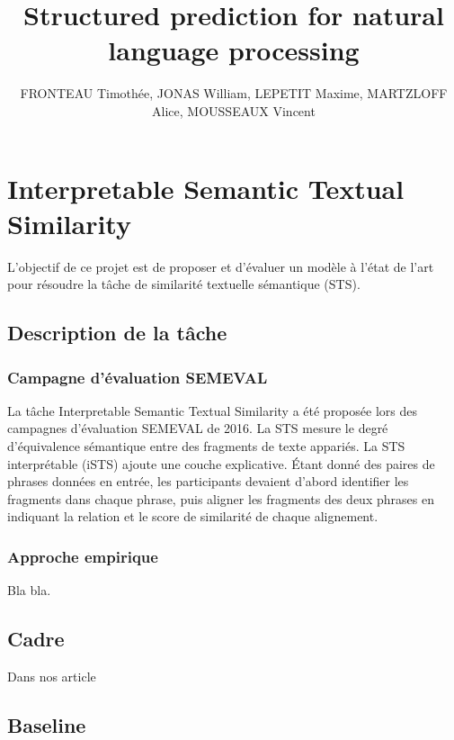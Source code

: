 \documentclass[a4paper, twoside, 12pt]{article}
\title{\huge Structured prediction for natural language processing}
\author{FRONTEAU Timothée, JONAS William, LEPETIT Maxime, MARTZLOFF Alice, MOUSSEAUX Vincent}
\affil{Aix-Marseille Université}
\begin{document}
 \maketitle
 \section{Interpretable Semantic Textual Similarity}
    L'objectif de ce projet est de proposer et d'évaluer un modèle à l’état de l’art pour résoudre la tâche de similarité textuelle sémantique (STS).

    \subsection{Description de la tâche}

        \subsubsection{Campagne d’évaluation SEMEVAL}

    La tâche Interpretable Semantic Textual Similarity a été proposée lors des campagnes d’évaluation SEMEVAL de 2016. La STS mesure le degré d'équivalence sémantique entre des fragments de texte appariés. La STS interprétable (iSTS) ajoute une couche explicative. Étant donné des paires de phrases données en entrée, les participants devaient d'abord identifier les fragments dans chaque phrase, puis aligner les fragments des deux phrases en indiquant la relation et le score de similarité de chaque alignement.

        \subsubsection{Approche empirique}

    Bla bla.
    \subsection{Cadre}

    Dans nos article

    \subsection{Baseline}
\end{document}
